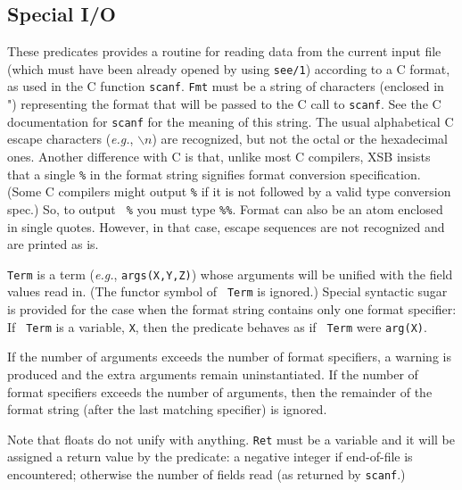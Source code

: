 \subsection{Special I/O}

\begin{description}
\vspace{-7mm}
%
    These predicates provides a routine for reading data from the
    current input file (which must have been already opened by using
    {\tt see/1}) according to a C format, as used in the C function
    {\tt scanf}. {\tt Fmt} must be a string of characters (enclosed in
    ") representing the format that will be passed to the C call to
    {\tt scanf}.  See the C documentation for {\tt scanf} for the
    meaning of this string.  The usual alphabetical C escape
    characters ({\it e.g.}, $\backslash n$) are recognized, but not
    the octal or the hexadecimal ones.  Another difference with C is
    that, unlike most C compilers, XSB insists that a single {\tt \%}
    in the format string signifies format conversion
    specification. (Some C compilers might output {\tt \%} if it is
    not followed by a valid type conversion spec.) So, to output {\tt
    \%} you must type {\tt \%\%}.  Format can also be an atom enclosed
    in single quotes. However, in that case, escape sequences are not
    recognized and are printed as is.

    {\tt Term} is a term ({\it e.g.}, {\tt args(X,Y,Z)})  whose arguments
    will be unified with the field values read in.  (The functor symbol of {\tt
    Term} is ignored.)  Special syntactic sugar is provided for the case
    when the format string contains only one format specifier: If {\tt
    Term} is a variable, {\tt X}, then the predicate behaves as if {\tt
    Term} were {\tt arg(X)}.

  If the number of arguments exceeds the number of format specifiers, a
  warning is produced and the extra arguments remain uninstantiated.
  If the number of format specifiers exceeds the number of arguments, then
  the remainder of the format string (after the last matching specifier) is
  ignored.
  
  Note that floats do not unify with anything.  {\tt Ret} must be a
  variable and it will be assigned a return value by the predicate: a
  negative integer if end-of-file is encountered; otherwise the number of
  fields read (as returned by {\tt scanf}.)
  

\end{description}
